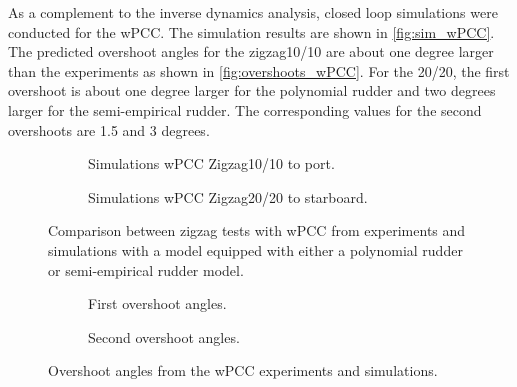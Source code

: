 As a complement to the inverse dynamics analysis, closed loop simulations were conducted for the wPCC. The simulation results are shown in \autoref{fig:sim_wPCC}. The predicted overshoot angles for the zigzag10/10 are about one degree larger than the experiments as shown in \autoref{fig:overshoots_wPCC}. For the 20/20, the first overshoot is about one degree larger for the polynomial rudder and two degrees larger for the semi-empirical rudder. The corresponding values for the second overshoots are 1.5 and 3 degrees.       

\begin{figure}[h]
     \centering
     \begin{subfigure}[b]{\textwidth}
         \centering
         
        \caption{Simulations wPCC Zigzag10/10 to port.}
        \label{fig:sim_wPCC_10}
     \end{subfigure}
     \vfill
     \begin{subfigure}[b]{\textwidth}
        \centering
        
        \caption{Simulations wPCC Zigzag20/20 to starboard.}
        \label{fig:sim_wPCC_20}
     \end{subfigure}
        \caption{Comparison between zigzag tests with wPCC from experiments and simulations with a model equipped with either a polynomial rudder or semi-empirical rudder model.}
        \label{fig:sim_wPCC}
\end{figure}

\begin{figure}[h]
     \centering
     \begin{subfigure}[b]{\textwidth}
         \centering
         
        \caption{First overshoot angles.}
        \label{fig:overhoots1_wPCC}
     \end{subfigure}
     \vfill
     \begin{subfigure}[b]{\textwidth}
         \centering
         
        \caption{Second overshoot angles.}
        \label{fig:overhoots2_wPCC}
     \end{subfigure}
     
        \caption{Overshoot angles from the wPCC experiments and simulations.}
        \label{fig:overshoots_wPCC}
\end{figure}